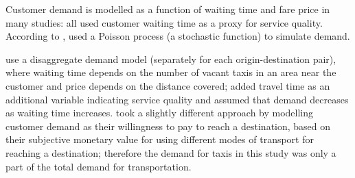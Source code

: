 Customer demand is modelled as a function of waiting time and fare price in
many studies: \textcite{Douglas1972taxi+regulation, Devany1975taxi+capacity,
Cairns1996taxi+competition, Yang2002taxi+demand} all used customer waiting time
as a proxy for service quality. According to
\textcite{Salanova2011taxi+review}, \textcite{Manski1967taxi+demand} used a
Poisson process (a stochastic function) to simulate demand.

\textcite{Yang2002taxi+demand} use a disaggregate demand model (separately for
each origin-destination pair), where waiting time depends on the number of
vacant taxis in an area near the customer and price depends on the distance
covered; \textcite{Yang2010taxi+nonlinear} added travel time as an additional
variable indicating service quality and assumed that demand decreases as
waiting time increases. \textcite{Yang2010taxi+equilibria} took a slightly
different approach by modelling customer demand as their willingness to pay to
reach a destination, based on their subjective monetary value for using
different modes of transport for reaching a destination; therefore the demand
for taxis in this study was only a part of the total demand for transportation.
